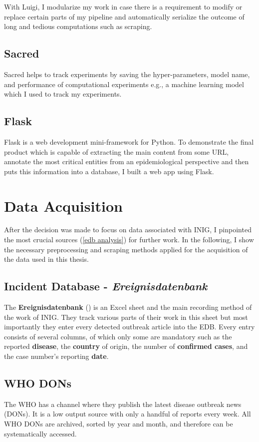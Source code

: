 With Luigi, I modularize my work in case there is a requirement to modify or replace certain parts of my pipeline and automatically serialize the outcome of long and tedious computations such as scraping.

\subsection{Sacred}
Sacred helps to track experiments by saving the hyper-parameters, model name, and performance of computational experiments e.g., a machine learning model which I used to track my experiments.

\subsection{Flask}
Flask is a web development mini-framework for Python.
To demonstrate the final product which is capable of extracting the main content from some URL, annotate the most critical entities from an epidemiological perspective and then puts this information into a database, I built a web app using Flask.

\section{Data Acquisition}
After the decision was made to focus on data associated with INIG, I pinpointed the most crucial sources (\ref{edb analysis}) for further work. In the following, I show the necessary preprocessing and scraping methods applied for the acquisition of the data used in this thesis.

\subsection{Incident Database - \textit{Ereignisdatenbank}}
The \textbf{Ereignisdatenbank} () is an Excel sheet and the main recording method of the work of INIG. They track various parts of their work in this sheet but most importantly they enter every detected outbreak article into the EDB. Every entry consists of several columns, of which only some are mandatory such as the reported \textbf{disease}, the \textbf{country} of origin, the number of \textbf{confirmed cases}, and the case number's reporting \textbf{date}.

\subsection{WHO DONs}
The WHO has a channel where they publish the latest disease outbreak news (DONs).
It is a low output source with only a handful of reports every week.
All WHO DONs are archived, sorted by year and month, and therefore can be systematically accessed.

